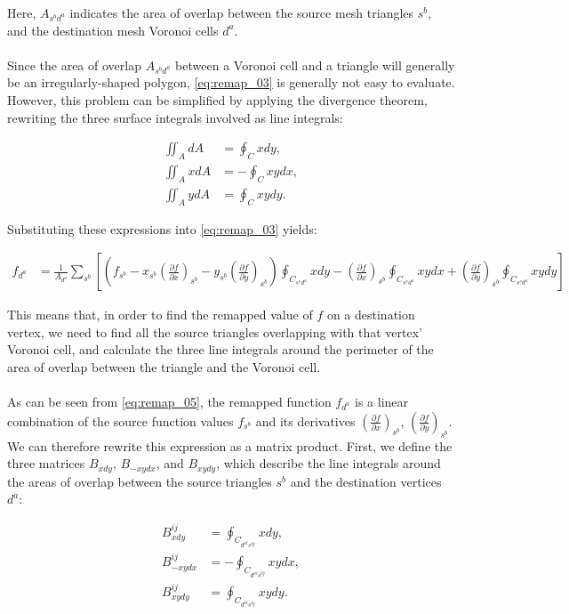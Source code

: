 \documentclass{article}
\begin{document}
Here, $A_{s^b d^a}$ indicates the area of overlap between the source mesh triangles $s^b$, and the destination mesh Voronoi cells $d^a$.\\
\\
Since the area of overlap $A_{s^b d^a}$ between a Voronoi cell and a triangle will generally be an irregularly-shaped polygon, \eqref{eq:remap_03} is generally not easy to evaluate. However, this problem can be simplified by applying the divergence theorem, rewriting the three surface integrals involved as line integrals:

\begin{align} \label{eq:remap_04}
\iint_A dA &= \oint_C x dy, \\
\iint_A x dA &= - \oint_C xy dx, \\
\iint_A y dA &= \oint_C xy dy.
\end{align}

Substituting these expressions into \eqref{eq:remap_03} yields:

\begin{align} \label{eq:remap_05}
f_{d^a} &= \frac{1}{A_{d^a}} \sum_{s^b} \left[ \left( f_{s^b}
  - x_{s^b} {\left( \frac{\partial f}{\partial x} \right)}_{s^b}
  - y_{s^b}  {\left( \frac{\partial f}{\partial y} \right)}_{s^b} \right) \oint_{C_{s^v d^a}} x dy -
  {\left( \frac{\partial f}{\partial x} \right)}_{s^b} \oint_{C_{s^v d^a}} xy dx + 
  {\left( \frac{\partial f}{\partial y} \right)}_{s^b} \oint_{C_{s^v d^a}} xy dy 
  \right]
\end{align}

This means that, in order to find the remapped value of $f$ on a destination vertex, we need to find all the source triangles overlapping with that vertex' Voronoi cell, and calculate the three line integrals around the perimeter of the area of overlap between the triangle and the Voronoi cell.\\
\\
As can be seen from \eqref{eq:remap_05}, the remapped function $f_{d^a}$ is a linear combination of the source function values $f_{s^b}$ and its derivatives ${\left( \frac{\partial f}{\partial x} \right)}_{s^b}$, ${\left( \frac{\partial f}{\partial y} \right)}_{s^b}$. We can therefore rewrite this expression as a matrix product. First, we define the three matrices $B_{xdy}$, $B_{-xydx}$, and $B_{xydy}$, which describe the line integrals around the areas of overlap between the source triangles $s^b$ and the destination vertices $d^a$:

\begin{align} \label{eq:remap_06}
B_{xdy}^{ij} &= \oint_{C_{d^{ai} s^{bj}}} x dy, \\
B_{-xydx}^{ij} &= - \oint_{C_{d^{ai} s^{bj}}} xy dx, \\
B_{xydy}^{ij} &= \oint_{C_{d^{ai} s^{bj}}} xy dy.
\end{align}
\end{document}
